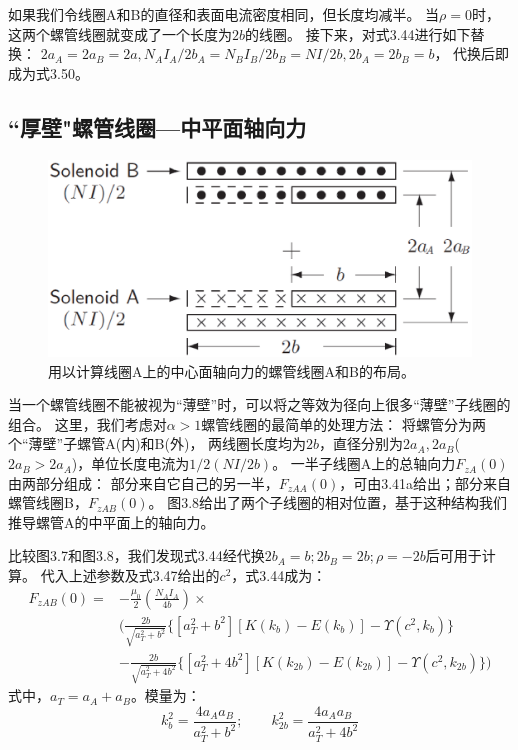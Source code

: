 如果我们令线圈A和B的直径和表面电流密度相同，但长度均减半。
当$\rho=0$时，这两个螺管线圈就变成了一个长度为$2b$的线圈。
接下来，对式3.44进行如下替换：
$2a_A=2a_B=2a, N_A I_A/2b_A = N_B I_B/2b_B = NI/2b,2b_A = 2b_B = b$，
代换后即成为式3.50。

\subsection{``厚壁"螺管线圈---中平面轴向力}
\begin{figure}[htbp]
  \centering
 \includegraphics[scale=0.4]{chpt3/figs/fig3.8.eps}
  \caption{用以计算线圈A上的中心面轴向力的螺管线圈A和B的布局。}
\end{figure}

当一个螺管线圈不能被视为``薄壁''时，可以将之等效为径向上很多``薄壁''子线圈的组合。
这里，我们考虑对$\alpha>1$螺管线圈的最简单的处理方法：
将螺管分为两个``薄壁''子螺管A(内)和B(外)，
两线圈长度均为$2b$，直径分别为$2a_A,2a_B$($2a_B >2a_A$)，单位长度电流为$1/2(NI/2b)$。
一半子线圈A上的总轴向力$F_{zA}(0)$由两部分组成：
部分来自它自己的另一半，$F_{zAA}(0)$，可由3.41a给出；部分来自螺管线圈B，$F_{zAB}(0)$。
图3.8给出了两个子线圈的相对位置，基于这种结构我们推导螺管A的中平面上的轴向力。

比较图3.7和图3.8，我们发现式3.44经代换$2b_A = b; 2b_B = 2b; \rho = −2b$后可用于计算。
代入上述参数及式3.47给出的$c^2$，式3.44成为：
\begin{equation}
\begin{split}
F_{zAB}(0)=&-\frac{\mu_0}{2}(\frac{N_A I_A}{4b})\times \\
&\bigg(\frac{2b}{\sqrt{a_T^2+b^2}} \{[a_T^2+b^2][K(k_{b})-E(k_{b})]-\Upsilon(c^2,k_b)\}\\
&-\frac{2b}{\sqrt{a_T^2+4b^2}} \{[a_T^2+4b^2][K(k_{2b})-E(k_{2b})]-\Upsilon(c^2,k_{2b}) \}\bigg)
\end{split}
\end{equation}
式中，$a_T=a_A+a_B$。模量为：
$$k_{b}^2=\frac{4a_A a_B}{a_T^2+b^2} ;\qquad k_{2b}^2=\frac{4a_A a_B}{a_T^2+4b^2} $$

